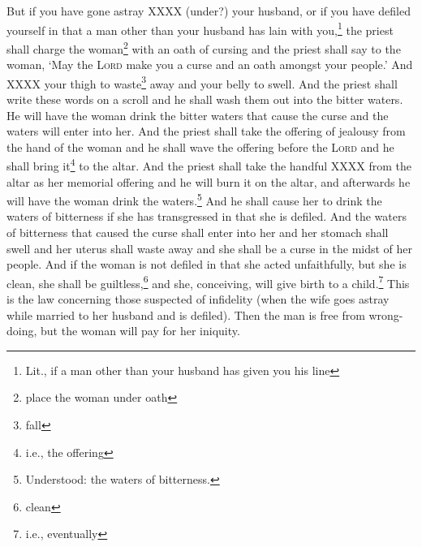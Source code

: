 \begin{enumerate}[align=center]
     But if you have gone astray XXXX (under?) your husband, or if you have defiled yourself in that a man other than your husband has lain with you,\footnote{Lit., if a man other than your husband has given you his line}%
     the priest shall charge the woman\footnote{place the woman under oath} with an oath of cursing and the priest shall say to the woman, `May the \textsc{Lord} make you a curse and an oath amongst your people.' And XXXX your thigh to waste\footnote{fall} away and your belly to swell.%
     And the priest shall write these words on a scroll and he shall wash them out into the bitter waters.%
     He will have the woman drink the bitter waters that cause the curse and the waters will enter into her.%
     And the priest shall take the offering of jealousy from the hand of the woman and he shall wave the offering before the \textsc{Lord} and he shall bring it\footnote{i.e., the offering} to the altar.%
     And the priest shall take the handful XXXX from the altar as her memorial offering and he will burn it on the altar, and afterwards he will have the woman drink the waters.\footnote{Understood: the waters of bitterness.}%
     And he shall cause her to drink the waters of bitterness if she has transgressed in that she is defiled. And the waters of bitterness that caused the curse shall enter into her and her stomach shall swell and her uterus shall waste away and she shall be a curse in the midst of her people.%
     And if the woman is not defiled in that she acted unfaithfully, but she is clean, she shall be guiltless,\footnote{clean} and she, conceiving, will give birth to a child.\footnote{i.e., eventually}%
     This is the law concerning those suspected of infidelity (when the wife goes astray while married to her husband and is defiled).%
     Then the man is free from wrong-doing, but the woman will pay for her iniquity.%
\end{enumerate}
